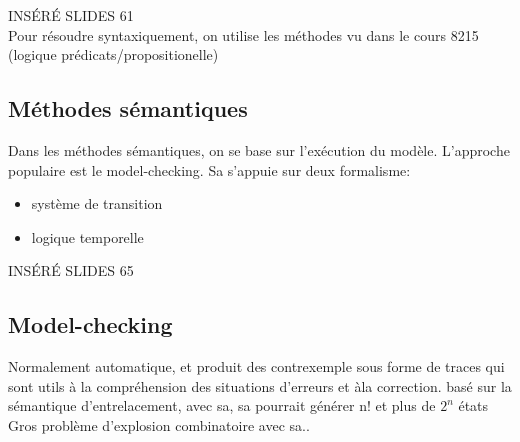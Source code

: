 \documentclass[oneside]{book}
\begin{document}
    INSÉRÉ SLIDES 61\\
    
    Pour résoudre syntaxiquement, on utilise les méthodes vu dans le cours 8215 (logique prédicats/propositionelle)\\
    
    \subsection{Méthodes sémantiques}
    Dans les méthodes sémantiques, on se base sur l'exécution du modèle. L'approche populaire est le model-checking. Sa s'appuie sur deux formalisme:
    \begin{itemize}
        \item système de transition
        \item logique temporelle
    \end{itemize}

    INSÉRÉ SLIDES 65\\
    
    \subsection{Model-checking}
    Normalement automatique, et produit des contrexemple sous forme de traces qui sont utils à la compréhension des situations d'erreurs et àla correction. basé sur la sémantique d'entrelacement, avec sa, sa pourrait générer n! et plus de $2^{n}$ états\\
    
    Gros problème d'explosion combinatoire avec sa..\\
    
    
\end{document}
